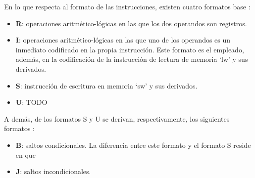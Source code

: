 En lo que respecta al formato de las instrucciones, existen cuatro formatos base \cite{riscv-unpriv-isa-20250508-unpriv-isa-base-instr-formats}:

\begin{itemize}
  \item \textbf{R}: operaciones aritmético-lógicas en las que los dos operandos son registros. 
  \vspace{-0.2cm}
  \item \textbf{I}: operaciones aritmético-lógicas en las que uno de los operandos es un inmediato codificado en la propia instrucción. Este formato es el empleado, además, en la codificación de la instrucción de lectura de memoria `lw' y sus derivados.
  \vspace{-0.2cm}
  \item \textbf{S}: instrucción de escritura en memoria `sw' y sus derivados.
  \vspace{-0.2cm}
  \item \textbf{U}: TODO
  \vspace{-0.2cm}
\end{itemize}

A demás, de los formatos S y U se derivan, respectivamente, los siguientes formatos \cite{riscv-unpriv-isa-20250508-unpriv-isa-b-j-formats}:

\begin{itemize}
  \item \textbf{B}: saltos condicionales. La diferencia entre este formato y el formato S reside en que 
  \vspace{-0.2cm}
  \item \textbf{J}: saltos incondicionales.
\end{itemize}